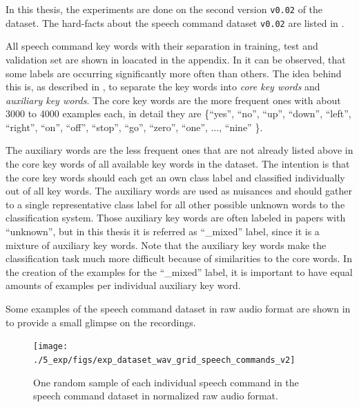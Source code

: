 In this thesis, the experiments are done on the second version \texttt{v0.02} of the dataset.
The hard-facts about the speech command dataset \texttt{v0.02} are listed in .

All speech command key words with their separation in training, test and validation set are shown in  loacated in the appendix.
%
In  it can be observed, that some labels are occurring significantly more often than others.
The idea behind this is, as described in \cite{Warden2018}, to separate the key words into \emph{core key words} and \emph{auxiliary key words}.
The core key words are the more frequent ones with about 3000 to 4000 examples each, in detail they are \{\enquote{yes}, \enquote{no}, \enquote{up}, \enquote{down}, \enquote{left}, \enquote{right}, \enquote{on}, \enquote{off}, \enquote{stop}, \enquote{go}, \enquote{zero}, \enquote{one}, ..., \enquote{nine} \}.

The auxiliary words are the less frequent ones that are not already listed above in the core key words of all available key words in the dataset.
The intention is that the core key words should each get an own class label and classified individually out of all key words.
The auxiliary words are used as nuisances and should gather to a single representative class label for all other possible unknown words to the classification system.
Those auxiliary key words are often labeled in papers with \enquote{unknown}, but in this thesis it is referred as \enquote{\_mixed} label, since it is a mixture of auxiliary key words.
Note that the auxiliary key words make the classification task much more difficult because of similarities to the core words.
In the creation of the examples for the \enquote{\_mixed} label, it is important to have equal amounts of examples per individual auxiliary key word.

Some examples of the speech command dataset in raw audio format are shown in  to provide a small glimpse on the recordings.
\begin{figure}[!ht]
  \centering
    \texttt{[image: ./5\_exp/figs/exp\_dataset\_wav\_grid\_speech\_commands\_v2]}
  \caption{One random sample of each individual speech command in the speech command dataset in normalized raw audio format.}
  \label{fig:exp_dataset_wav_grid_speech_commands_v2}
\end{figure}
\FloatBarrier
\noindent


